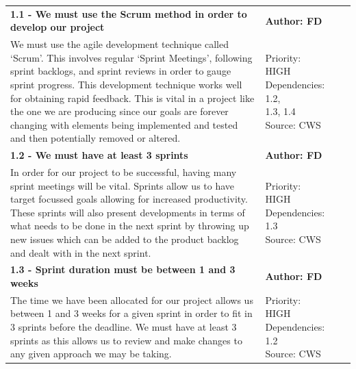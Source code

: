 \documentclass[10pt, notitlepage]{report}
\begin{document}
\begin{center}

\begin{longtable}{| p{13cm} | p{3cm} |}
\endfirsthead
\endlastfoot

\multicolumn{2}{c}{\textit{Continued from last page}}
\endhead

\multicolumn{2}{c}{\textit{Continued on next page}}
\endfoot

\hline
\multicolumn{2}{|l|}{\textbf{\textit{1 - Software Development Process}}} \\
\hline
\textbf{1.1 - We must use the Scrum method in order to develop our project} & \textbf{Author: FD} \\
\hline
We must use the agile development technique called ‘Scrum’. This involves regular ‘Sprint Meetings’, following sprint backlogs, and sprint reviews in order to gauge sprint progress. This development technique works well for obtaining rapid feedback. This is vital in a project like the one we are producing since our goals are forever changing with elements being implemented and tested and then potentially removed or altered.&
\makecell{Priority: HIGH\\Dependencies: 1.2,\\1.3, 1.4\\Source: CWS}\\
\hline
\textbf{1.2 - We must have at least 3 sprints} & \textbf{Author: FD} \\
\hline
In order for our project to be successful, having many sprint meetings will be vital. Sprints allow us to have target focussed goals allowing for increased productivity. These sprints will also present developments in terms of what needs to be done in the next sprint by throwing up new issues which can be added to the product backlog and dealt with in the next sprint.&
\makecell{Priority: HIGH\\Dependencies: 1.3\\Source: CWS} \\
\hline
\textbf{1.3 - Sprint duration must be between 1 and 3 weeks} & \textbf{Author: FD} \\
\hline
The time we have been allocated for our project allows us between 1 and 3 weeks for a given sprint in order to fit in 3 sprints before the deadline. We must have at least 3 sprints as this allows us to review and make changes to any given approach we may be taking.&
\makecell{Priority: HIGH\\Dependencies: 1.2\\Source: CWS} \\

\end{longtable}
\end{center}
\end{document}
